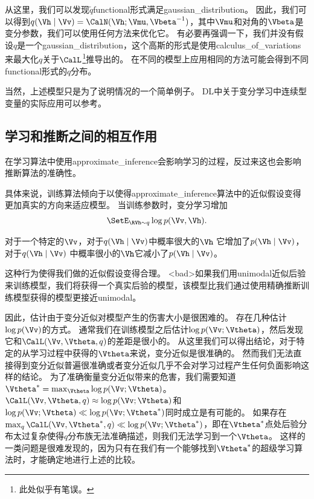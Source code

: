 从这里，我们可以发现$\tilde{q}$\gls{functional}形式满足\gls{gaussian_distribution}。
因此，我们可以得到$q(\Vh\mid\Vv) = \CalN(\Vh;\Vmu,\Vbeta^{-1})$，其中$\Vmu$和对角的$\Vbeta$是变分参数，我们可以使用任何方法来优化它。
有必要再强调一下，我们并没有假设$q$是一个\gls{gaussian_distribution}，这个高斯的形式是使用\gls{calculus_of_variations}来最大化$q$关于$\CalL$\footnote{此处似乎有笔误。}推导出的。
在不同的模型上应用相同的方法可能会得到不同\gls{functional}形式的$q$分布。

当然，上述模型只是为了说明情况的一个简单例子。
\gls{DL}中关于变分学习中连续型变量的实际应用可以参考\citet{Goodfeli-et-al-TPAMI-Deep-PrePrint-2013-small}。



\subsection{学习和推断之间的相互作用}
\label{sec:interactions_between_learning_and_inference}


在学习算法中使用\gls{approximate_inference}会影响学习的过程，反过来这也会影响推断算法的准确性。


具体来说，训练算法倾向于以使得\gls{approximate_inference}算法中的近似假设变得更加真实的方向来适应模型。
当训练参数时，变分学习增加
\begin{align}
\label{eqn:1968}
	\SetE_{\RVh \sim q}\log p(\Vv,\Vh).
\end{align}

对于一个特定的$\Vv$，对于$q(\Vh \mid \Vv)$中概率很大的$\Vh$ 它增加了$p(\Vh\mid\Vv)$，对于$q(\Vh \mid \Vv) $ 中概率很小的$\Vh$它减小了$p(\Vh\mid\Vv)$。

这种行为使得我们做的近似假设变得合理。 %
<bad>如果我们用\gls{unimodal}近似后验来训练模型，我们将获得一个真实后验的模型，该模型比我们通过使用精确推断训练模型获得的模型更接近\gls{unimodal}。

	
因此，估计由于变分近似对模型产生的伤害大小是很困难的。
存在几种估计$\log p(\Vv)$的方式。
通常我们在训练模型之后估计$\log p(\Vv;\Vtheta)$，然后发现它和$\CalL(\Vv,\Vtheta,q)$的差距是很小的。
从这里我们可以得出结论，对于特定的从学习过程中获得的$\Vtheta$来说，变分近似是很准确的。
然而我们无法直接得到变分近似普遍很准确或者变分近似几乎不会对学习过程产生任何负面影响这样的结论。
为了准确衡量变分近似带来的危害，我们需要知道$\Vtheta^* = \max_{\Vtheta} \log p(\Vv;\Vtheta)$。
$\CalL(\Vv,\Vtheta,q)\approx \log p(\Vv;\Vtheta)$和$\log p(\Vv;\Vtheta)\ll \log p(\Vv;\Vtheta^*)$同时成立是有可能的。
如果存在$\max_q \CalL(\Vv,\Vtheta^*,q)\ll \log p(\Vv;\Vtheta^*)$，即在$\Vtheta^*$点处后验分布太过复杂使得$q$分布族无法准确描述，则我们无法学习到一个$\Vtheta$。
这样的一类问题是很难发现的，因为只有在我们有一个能够找到$\Vtheta^*$的超级学习算法时，才能确定地进行上述的比较。



